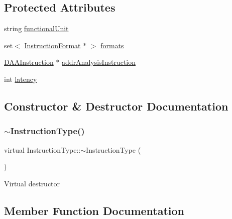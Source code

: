 \subsection*{Protected Attributes}
\begin{DoxyCompactItemize}
\item 
string \hyperlink{classInstructionType_a5163498ca8a68d727c6c89cd443a37f8}{functional\+Unit}
\item 
set$<$ \hyperlink{classInstructionFormat}{Instruction\+Format} $\ast$ $>$ \hyperlink{classInstructionType_a039493f9dcd605e25bb96ac3f510a501}{formats}
\item 
\hyperlink{classDAAInstruction}{D\+A\+A\+Instruction} $\ast$ \hyperlink{classInstructionType_a7dfb488bd47f9168dc5fa1604a18c6c4}{addr\+Analysis\+Instruction}
\item 
int \hyperlink{classInstructionType_a99de20a7ccac1417a3e777ff25dfe3ed}{latency}
\end{DoxyCompactItemize}


\subsection{Constructor \& Destructor Documentation}
\mbox{\label{classInstructionType_ae3415fa195f43d8fd0c4c66fab307e3d}} 
\subsubsection{\texorpdfstring{$\sim$\+Instruction\+Type()}{~InstructionType()}}
{\footnotesize\ttfamily virtual Instruction\+Type\+::$\sim$\+Instruction\+Type (\begin{DoxyParamCaption}{ }\end{DoxyParamCaption})\hspace{0.3cm}{\ttfamily [virtual]}}

Virtual destructor 

\subsection{Member Function Documentation}
\mbox{\label{classInstructionType_a0711bca7a3ca0a21ff6b9ae940c13acf}} 
